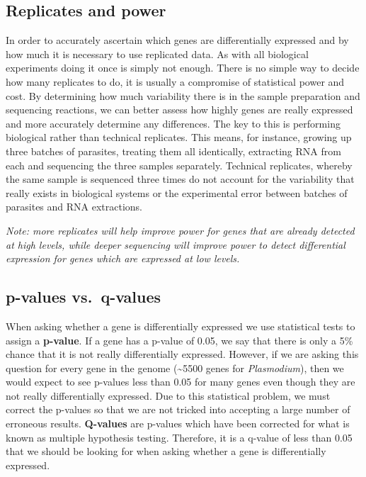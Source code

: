 \documentclass[11pt]{article}
\begin{document}
    \hypertarget{replicates-and-power}{%
\subsection{Replicates and power}\label{replicates-and-power}}

In order to accurately ascertain which genes are differentially
expressed and by how much it is necessary to use replicated data. As
with all biological experiments doing it once is simply not enough.
There is no simple way to decide how many replicates to do, it is
usually a compromise of statistical power and cost. By determining how
much variability there is in the sample preparation and sequencing
reactions, we can better assess how highly genes are really expressed
and more accurately determine any differences. The key to this is
performing biological rather than technical replicates. This means, for
instance, growing up three batches of parasites, treating them all
identically, extracting RNA from each and sequencing the three samples
separately. Technical replicates, whereby the same sample is sequenced
three times do not account for the variability that really exists in
biological systems or the experimental error between batches of
parasites and RNA extractions.

\textit{Note: more replicates will help improve power for genes that are
already detected at high levels, while deeper sequencing will improve
power to detect differential expression for genes which are expressed at
low levels.}

\hypertarget{p-values-vs.-q-values}{%
\subsection{p-values vs.~q-values}\label{p-values-vs.-q-values}}

When asking whether a gene is differentially expressed we use
statistical tests to assign a \textbf{p-value}. If a gene has a p-value
of 0.05, we say that there is only a 5\% chance that it is not really
differentially expressed. However, if we are asking this question for
every gene in the genome (\textasciitilde5500 genes for
\textit{Plasmodium}), then we would expect to see p-values less than 0.05
for many genes even though they are not really differentially expressed.
Due to this statistical problem, we must correct the p-values so that we
are not tricked into accepting a large number of erroneous results.
\textbf{Q-values} are p-values which have been corrected for what is
known as multiple hypothesis testing. Therefore, it is a q-value of less
than 0.05 that we should be looking for when asking whether a gene is
differentially expressed.
\end{document}
